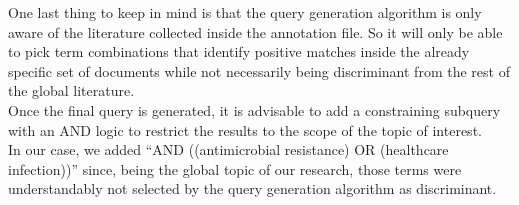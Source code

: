\documentclass[
]{article}
\newenvironment{Shaded}{\begin{snugshade}}{\end{snugshade}}
\newcommand{\AttributeTok}[1]{\textcolor[rgb]{0.77,0.63,0.00}{#1}}
\newcommand{\CommentTok}[1]{\textcolor[rgb]{0.56,0.35,0.01}{\textit{#1}}}
\newcommand{\FunctionTok}[1]{\textcolor[rgb]{0.00,0.00,0.00}{#1}}
\newcommand{\NormalTok}[1]{#1}
\newcommand{\OtherTok}[1]{\textcolor[rgb]{0.56,0.35,0.01}{#1}}
\newcommand{\SpecialCharTok}[1]{\textcolor[rgb]{0.00,0.00,0.00}{#1}}
\newcommand{\StringTok}[1]{\textcolor[rgb]{0.31,0.60,0.02}{#1}}
\begin{document}
\begin{Shaded}
\end{Shaded}

One last thing to keep in mind is that the query generation algorithm is
only aware of the literature collected inside the annotation file. So it
will only be able to pick term combinations that identify positive
matches inside the already specific set of documents while not
necessarily being discriminant from the rest of the global literature.\\
Once the final query is generated, it is advisable to add a constraining
subquery with an AND logic to restrict the results to the scope of the
topic of interest.\\
In our case, we added ``AND ((antimicrobial resistance) OR (healthcare
infection))'' since, being the global topic of our research, those terms
were understandably not selected by the query generation algorithm as
discriminant.\\
\end{document}
